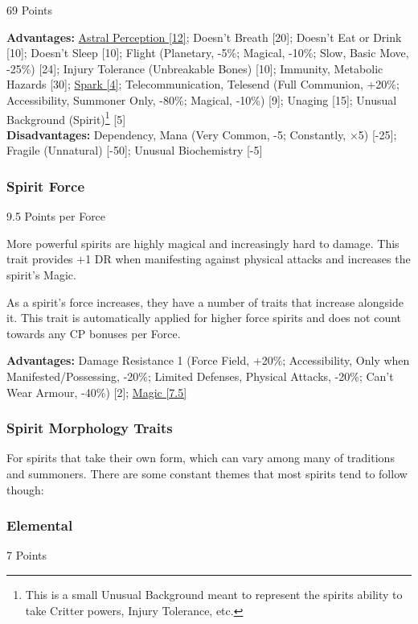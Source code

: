 \begin{multicols}{3}
	\begin{flushright}
		69 Points
	\end{flushright}
	\textbf{Advantages:} 
	\hyperref[astral_perception]{Astral Perception [12]}; Doesn't Breath [20]; Doesn't Eat or Drink [10]; Doesn't Sleep [10]; Flight (Planetary, -5\%; Magical, -10\%; Slow, Basic Move, -25\%) [24]; Injury Tolerance (Unbreakable Bones) [10]; Immunity, Metabolic Hazards [30]; \hyperref[spark]{Spark [4]}; Telecommunication, Telesend (Full Communion, +20\%; Accessibility, Summoner Only, -80\%; Magical, -10\%) [9]; Unaging [15]; Unusual Background (Spirit)\footnote{This is a small Unusual Background meant to represent the spirits ability to take Critter powers, Injury Tolerance, etc.} [5]
	\\\textbf{Disadvantages:} 
	Dependency, Mana (Very Common, -5; Constantly, \(\times\)5) [-25]; Fragile (Unnatural) [-50]; Unusual Biochemistry [-5]
	
	\subsubsection{Spirit Force}\label{spirit_force}
	\begin{flushright}
		9.5 Points per Force
	\end{flushright}
	
	More powerful spirits are highly magical and increasingly hard to damage. This trait provides +1 DR when manifesting against physical attacks and increases the spirit's Magic.
	
	As a spirit's force increases, they have a number of traits that increase alongside it. This trait is automatically applied for higher force spirits and does not count towards any CP bonuses per Force.
	
	\textbf{Advantages:}
	Damage Resistance 1 (Force Field, +20\%; Accessibility, Only when Manifested/Possessing, -20\%; Limited Defenses, Physical Attacks, -20\%; Can't Wear Armour, -40\%) [2]; \hyperref[magic]{Magic [7.5]}
	
	\subsubsection{Spirit Morphology Traits}
	
	For spirits that take their own form, which can vary among many of traditions and summoners. There are some constant themes that most spirits tend to follow though:
	
	\subsubsection*{Elemental}\label{elemental}
	\begin{flushright}
		7 Points
	\end{flushright}
	

\end{multicols}
